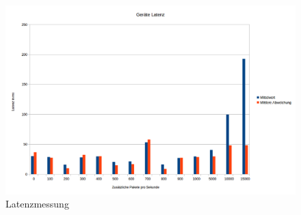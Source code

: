 \documentclass[a4paper]{spie}  %
\begin{document}
\begin{appendices}
\section{}
\begin{figure}[H]
	\centering
	\includegraphics[width=1\textwidth]{images/LatenzMessung.png}
	\caption{Latenzmessung}
	\label{latenzmessung}
\end{figure}

\end{appendices}
\end{document}
